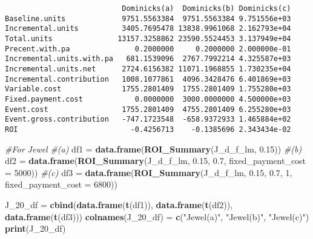 \documentclass[]{article}
\newenvironment{Shaded}{\begin{snugshade}}{\end{snugshade}}
\newcommand{\CommentTok}[1]{\textcolor[rgb]{0.56,0.35,0.01}{\textit{#1}}}
\newcommand{\DataTypeTok}[1]{\textcolor[rgb]{0.13,0.29,0.53}{#1}}
\newcommand{\DecValTok}[1]{\textcolor[rgb]{0.00,0.00,0.81}{#1}}
\newcommand{\FloatTok}[1]{\textcolor[rgb]{0.00,0.00,0.81}{#1}}
\newcommand{\KeywordTok}[1]{\textcolor[rgb]{0.13,0.29,0.53}{\textbf{#1}}}
\newcommand{\NormalTok}[1]{#1}
\newcommand{\StringTok}[1]{\textcolor[rgb]{0.31,0.60,0.02}{#1}}
\begin{document}
\begin{verbatim}
                           Dominicks(a)  Dominicks(b) Dominicks(c)
Baseline.units             9751.5563384  9751.5563384 9.751556e+03
Incremental.units          3405.7695478 13838.9961068 2.162793e+04
Total.units               13157.3258862 23590.5524453 3.137949e+04
Precent.with.pa               0.2000000     0.2000000 2.000000e-01
Incremental.units.with.pa   681.1539096  2767.7992214 4.325587e+03
Incremental.units.net      2724.6156382 11071.1968855 1.730235e+04
Incremental.contribution   1008.1077861  4096.3428476 6.401869e+03
Variable.cost              1755.2801409  1755.2801409 1.755280e+03
Fixed.payment.cost            0.0000000  3000.0000000 4.500000e+03
Event.cost                 1755.2801409  4755.2801409 6.255280e+03
Event.gross.contribution   -747.1723548  -658.9372933 1.465884e+02
ROI                          -0.4256713    -0.1385696 2.343434e-02
\end{verbatim}

\begin{Shaded}
\begin{Highlighting}[]
\CommentTok{#For Jewel}
\CommentTok{#(a) }
\NormalTok{df1 =}\StringTok{ }\KeywordTok{data.frame}\NormalTok{(}\KeywordTok{ROI_Summary}\NormalTok{(J_d_f_lm, }\FloatTok{0.15}\NormalTok{))}
\CommentTok{#(b)}
\NormalTok{df2 =}\StringTok{ }\KeywordTok{data.frame}\NormalTok{(}\KeywordTok{ROI_Summary}\NormalTok{(J_d_f_lm, }\FloatTok{0.15}\NormalTok{, }\FloatTok{0.7}\NormalTok{, }\DataTypeTok{fixed_payment_cost =} \DecValTok{5000}\NormalTok{))}
\CommentTok{#(c)}
\NormalTok{df3 =}\StringTok{ }\KeywordTok{data.frame}\NormalTok{(}\KeywordTok{ROI_Summary}\NormalTok{(J_d_f_lm, }\FloatTok{0.15}\NormalTok{, }\FloatTok{0.7}\NormalTok{, }\DecValTok{1}\NormalTok{, }\DataTypeTok{fixed_payment_cost =} \DecValTok{6800}\NormalTok{))}

\NormalTok{J_}\DecValTok{20}\NormalTok{_df =}\StringTok{ }\KeywordTok{cbind}\NormalTok{(}\KeywordTok{data.frame}\NormalTok{(}\KeywordTok{t}\NormalTok{(df1)), }\KeywordTok{data.frame}\NormalTok{(}\KeywordTok{t}\NormalTok{(df2)), }\KeywordTok{data.frame}\NormalTok{(}\KeywordTok{t}\NormalTok{(df3)))}
\KeywordTok{colnames}\NormalTok{(J_}\DecValTok{20}\NormalTok{_df) =}\StringTok{ }\KeywordTok{c}\NormalTok{(}\StringTok{"Jewel(a)"}\NormalTok{, }\StringTok{"Jewel(b)"}\NormalTok{, }\StringTok{"Jewel(c)"}\NormalTok{)}
\KeywordTok{print}\NormalTok{(J_}\DecValTok{20}\NormalTok{_df)}
\end{Highlighting}
\end{Shaded}
\end{document}
